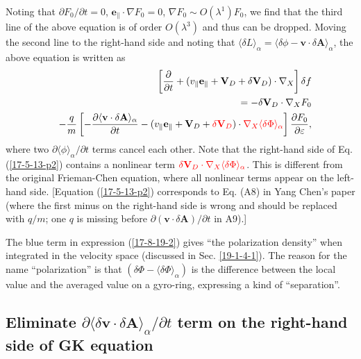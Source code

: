 \documentclass{llncs}
\newcommand{\tmcolor}[2]{{\color{#1}{#2}}}
\begin{document}
Noting that $\partial F_0 / \partial t = 0$, $\mathbf{e}_{\parallel} \cdot
\nabla F_0 = 0$, $\nabla F_0 \sim O (\lambda^1) F_0$, we find that the third
line of the above equation is of order $O (\lambda^3)$ and thus can be
dropped. Moving the second line to the right-hand side and noting that
$\langle \delta L \rangle_{\alpha} = \langle \delta \phi -\mathbf{v} \cdot
\delta \mathbf{A} \rangle_{\alpha}$, the above equation is written as
\begin{eqnarray}
  &  & \left[ \frac{\partial}{\partial t} + (v_{\parallel}
  \mathbf{e}_{\parallel} +\mathbf{V}_D + \delta \mathbf{V}_D) \cdot \nabla_X
  \right] \delta f \nonumber\\
  &  & = - \delta \mathbf{V}_D \cdot \nabla_X F_0 \nonumber\\
  &  & - \frac{q}{m} \left[ - \frac{\partial \langle \mathbf{v} \cdot \delta
  \mathbf{A} \rangle_{\alpha}}{\partial t} - (v_{\parallel}
  \mathbf{e}_{\parallel} +\mathbf{V}_D + \tmcolor{red}{\delta \mathbf{V}_D})
  \cdot \tmcolor{red}{\nabla_X \langle \delta \Phi \rangle_{\alpha}} \right]
  \frac{\partial F_0}{\partial \varepsilon},  \label{17-5-13-p2}
\end{eqnarray}
where two $\partial \langle \phi \rangle_{\alpha} / \partial t$ terms cancel
each other. Note that the right-hand side of Eq. (\ref{17-5-13-p2}) contains a
nonlinear term $\tmcolor{red}{\delta \mathbf{V}_D \cdot \nabla_X \langle
\delta \Phi \rangle_{\alpha}}$. This is different from the original
Frieman-Chen equation, where all nonlinear terms appear on the left-hand side.
[Equation (\ref{17-5-13-p2}) corresponds to Eq. (A8) in Yang Chen's
paper{\cite{ychen2009}} (where the first minus on the right-hand side is wrong
and should be replaced with $q / m$; one $q$ is missing before $\partial
(\mathbf{v} \cdot \delta \mathbf{A}) / \partial t$ in A9).]

The blue term in expression (\ref{17-8-19-2}) gives ``the polarization
density'' when integrated in the velocity space (discussed in Sec.
\ref{19-1-4-1}). The reason for the name ``polarization'' is that $(\delta
\Phi - \langle \delta \Phi \rangle_{\alpha})$ is the difference between the
local value and the averaged value on a gyro-ring, expressing a kind of
``separation''.

\subsection{Eliminate $\partial \langle \delta \mathbf{v} \cdot \delta
\mathbf{A} \rangle_{\alpha} / \partial t$ term on the right-hand side of GK
equation}
\end{document}

